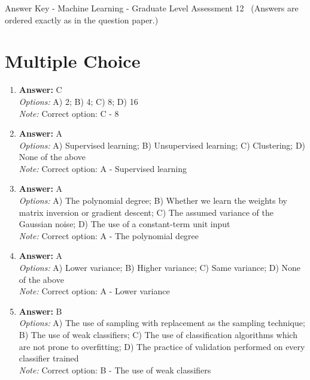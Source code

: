\documentclass[12pt]{article}
\begin{document}
\begin{center}
Answer Key - Machine Learning - Graduate Level Assessment 12 \
\small (Answers are ordered exactly as in the question paper.)
\end{center}

\section*{Multiple Choice}
\begin{enumerate}[label=\arabic*.]
\item \textbf{Answer:} C
\\ \textit{Options:} A) 2; B) 4; C) 8; D) 16
\\ \textit{Note:} Correct option: C - 8
\item \textbf{Answer:} A
\\ \textit{Options:} A) Supervised learning; B) Unsupervised learning; C) Clustering; D) None of the above
\\ \textit{Note:} Correct option: A - Supervised learning
\item \textbf{Answer:} A
\\ \textit{Options:} A) The polynomial degree; B) Whether we learn the weights by matrix inversion or gradient descent; C) The assumed variance of the Gaussian noise; D) The use of a constant-term unit input
\\ \textit{Note:} Correct option: A - The polynomial degree
\item \textbf{Answer:} A
\\ \textit{Options:} A) Lower variance; B) Higher variance; C) Same variance; D) None of the above
\\ \textit{Note:} Correct option: A - Lower variance
\item \textbf{Answer:} B
\\ \textit{Options:} A) The use of sampling with replacement as the sampling technique; B) The use of weak classifiers; C) The use of classification algorithms which are not prone to overfitting; D) The practice of validation performed on every classifier trained
\\ \textit{Note:} Correct option: B - The use of weak classifiers
\end{enumerate}
\end{document}
